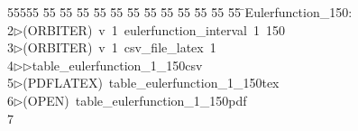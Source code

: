 %
%
\begin{tabbing}
55555 \= 55 \= 55 \= 55 \= 55 \= 55 \= 55 \= 55 \= 55 \= 55 \= 55 \= 55 \= 55 \= \>Eulerfunction\_150:\\[0pt]
2\>$\triangleright$\>(ORBITER)\ v\ 1\ eulerfunction\_interval\ 1\ 150\\[0pt]
3\>$\triangleright$\>(ORBITER)\ v\ 1\ csv\_file\_latex\ 1\ \\[0pt]
4\>$\triangleright$\>$\triangleright$\>table\_eulerfunction\_1\_150csv\\[0pt]
5\>$\triangleright$\>(PDFLATEX)\ table\_eulerfunction\_1\_150tex\\[0pt]
6\>$\triangleright$\>(OPEN)\ table\_eulerfunction\_1\_150pdf\\[0pt]
7\>\end{tabbing}
